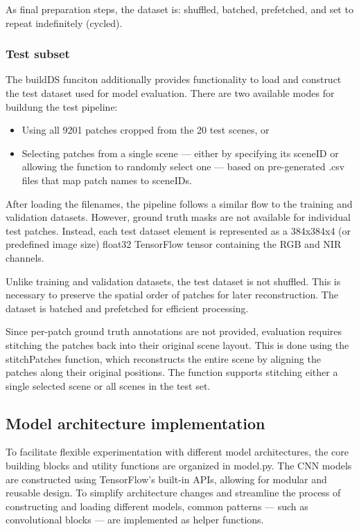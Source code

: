{As final preparation steps, the dataset is: shuffled, batched, prefetched, and set to repeat indefinitely (cycled).


\subsubsection{Test subset}

The buildDS funciton additionally provides functionality to load and construct the test dataset used for model evaluation. There are two available modes for buildung the test pipeline:

\begin{itemize}
    \item Using all 9201 patches cropped from the 20 test scenes, or
    \item Selecting patches from a single scene --- either by specifying its sceneID or allowing the function to randomly select one --- based on pre-generated .csv files that map patch names to sceneIDs.
\end{itemize}

After loading the filenames, the pipeline follows a similar flow to the training and validation datasets. However, ground truth masks are not available for individual test patches. Instead, each test dataset element is represented as a 384x384x4 (or predefined image size) float32 TensorFlow tensor containing the RGB and NIR channels.

Unlike training and validation datasets, the test dataset is not shuffled. This is necessary to preserve the spatial order of patches for later reconstruction. The dataset is batched and prefetched for efficient processing.

Since per-patch ground truth annotations are not provided, evaluation requires stitching the patches back into their original scene layout. This is done using the stitchPatches function, which reconstructs the entire scene by aligning the patches along their original positions. The function supports stitching either a single selected scene or all scenes in the test set.

\subsection{Model architecture implementation}

To facilitate flexible experimentation with different model architectures, the core building blocks and utility functions are organized in model.py. The CNN models are constructed using TensorFlow’s built-in APIs, allowing for modular and reusable design. To simplify architecture changes and streamline the process of constructing and loading different models, common patterns --- such as convolutional blocks --- are implemented as helper functions.

}
